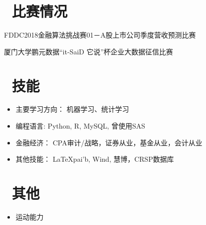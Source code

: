 \documentclass{resume}
\begin{document}
\section{\faUsers\ 比赛情况}
 {FDDC2018金融算法挑战赛01－A股上市公司季度营收预测比赛}

 {厦门大学鹏元数据“it-SaiD 它说”杯企业大数据征信比赛}
\section{\faCogs\ 技能}
\begin{itemize}[parsep=0.5ex]
  \item 主要学习方向： 机器学习、统计学习
  \item 编程语言: Python, R, MySQL, 曾使用SAS
  \item 金融经济： CPA审计/战略，证券从业，基金从业，会计从业
  \item 其他技能： LaTeXpai'b, Wind, 慧博，CRSP数据库
\end{itemize}
\section{\faInfo\ 其他}
\begin{itemize}[parsep=0.5ex]
  \item 运动能力
\end{itemize}

%
%
\end{document}
